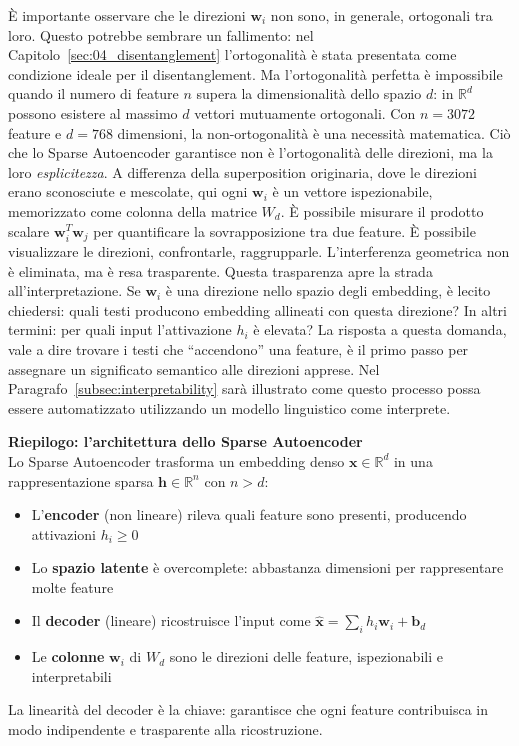 È importante osservare che le direzioni $\mathbf{w}_i$ non sono, in generale, ortogonali tra loro. Questo potrebbe sembrare un fallimento: nel Capitolo~\ref{sec:04_disentanglement} l'ortogonalità è stata presentata come condizione ideale per il disentanglement. Ma l'ortogonalità perfetta è impossibile quando il numero di feature $n$ supera la dimensionalità dello spazio $d$: in $\mathbb{R}^d$ possono esistere al massimo $d$ vettori mutuamente ortogonali. Con $n = 3072$ feature e $d = 768$ dimensioni, la non-ortogonalità è una necessità matematica.
Ciò che lo Sparse Autoencoder garantisce non è l'ortogonalità delle direzioni, ma la loro \textit{esplicitezza}. A differenza della superposition originaria, dove le direzioni erano sconosciute e mescolate, qui ogni $\mathbf{w}_i$ è un vettore ispezionabile, memorizzato come colonna della matrice $W_d$. È possibile misurare il prodotto scalare $\mathbf{w}_i^T \mathbf{w}_j$ per quantificare la sovrapposizione tra due feature. È possibile visualizzare le direzioni, confrontarle, raggrupparle. L'interferenza geometrica non è eliminata, ma è resa trasparente.
Questa trasparenza apre la strada all'interpretazione. Se $\mathbf{w}_i$ è una direzione nello spazio degli embedding, è lecito chiedersi: quali testi producono embedding allineati con questa direzione? In altri termini: per quali input l'attivazione $h_i$ è elevata? La risposta a questa domanda, vale a dire trovare i testi che ``accendono'' una feature, è il primo passo per assegnare un significato semantico alle direzioni apprese. Nel Paragrafo~\ref{subsec:interpretability} sarà illustrato come questo processo possa essere automatizzato utilizzando un modello linguistico come interprete.
\begin{notebox}
\textbf{Riepilogo: l'architettura dello Sparse Autoencoder}\\
Lo Sparse Autoencoder trasforma un embedding denso $\mathbf{x} \in \mathbb{R}^d$ in una rappresentazione sparsa $\mathbf{h} \in \mathbb{R}^n$ con $n > d$:
\begin{itemize}
    \item L'\textbf{encoder} (non lineare) rileva quali feature sono presenti, producendo attivazioni $h_i \geq 0$
    \item Lo \textbf{spazio latente} è overcomplete: abbastanza dimensioni per rappresentare molte feature
    \item Il \textbf{decoder} (lineare) ricostruisce l'input come $\hat{\mathbf{x}} = \sum_i h_i \mathbf{w}_i + \mathbf{b}_d$
    \item Le \textbf{colonne} $\mathbf{w}_i$ di $W_d$ sono le direzioni delle feature, ispezionabili e interpretabili
\end{itemize}
La linearità del decoder è la chiave: garantisce che ogni feature contribuisca in modo indipendente e trasparente alla ricostruzione.
\end{notebox}
